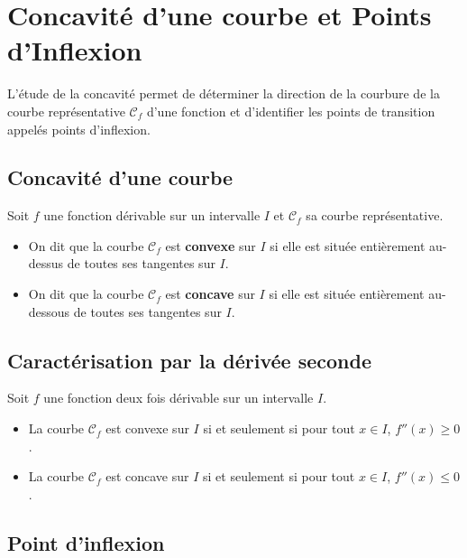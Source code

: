 \section{Concavité d'une courbe et Points d'Inflexion}

L'étude de la concavité permet de déterminer la direction de la courbure de la courbe représentative $\mathcal{C}_f$ d'une fonction et d'identifier les points de transition appelés points d'inflexion.

\subsection{Concavité d'une courbe}

\begin{definition}
Soit $f$ une fonction dérivable sur un intervalle $I$ et $\mathcal{C}_f$ sa courbe représentative.
\begin{itemize}
    \item On dit que la courbe $\mathcal{C}_f$ est \textbf{convexe} sur $I$ si elle est située entièrement au-dessus de toutes ses tangentes sur $I$.
    \item On dit que la courbe $\mathcal{C}_f$ est \textbf{concave} sur $I$ si elle est située entièrement au-dessous de toutes ses tangentes sur $I$.
\end{itemize}
\end{definition}

\subsection{Caractérisation par la dérivée seconde}

\begin{theoreme}
Soit $f$ une fonction deux fois dérivable sur un intervalle $I$.
\begin{itemize}
    \item La courbe $\mathcal{C}_f$ est convexe sur $I$ si et seulement si pour tout $x \in I$, $f''(x) \ge 0$.
    \item La courbe $\mathcal{C}_f$ est concave sur $I$ si et seulement si pour tout $x \in I$, $f''(x) \le 0$.
\end{itemize}
\end{theoreme}

\subsection{Point d'inflexion}

